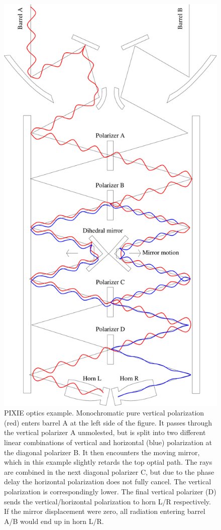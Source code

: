 \documentclass{article}
\begin{document}
\begin{figure}
	\centering
	\includegraphics[angle=90,width=170mm]{plots/optics_ex1.pdf}
	\caption{PIXIE optics example. Monochromatic pure vertical polarization (red) enters barrel
	A at the left side of the figure. It passes through the vertical polarizer A
	unmolested, but is split into two different linear combinations of vertical
	and horizontal (blue) polarization at the diagonal polarizer B. It then encounters
	the moving mirror, which in this example slightly retards the top optial path.
	The rays are combined in the next diagonal polarizer C, but due to the
	phase delay the horizontal polarization does not fully cancel. The vertical
	polarization is correspondingly lower. The final vertical polarizer (D)
	sends the vertical/horizontal polarization to horn L/R respectively.
	If the mirror displacement were zero, all radiation entering barrel A/B
	would end up in horn L/R.}
	\label{fig:fts}
\end{figure}
\end{document}
